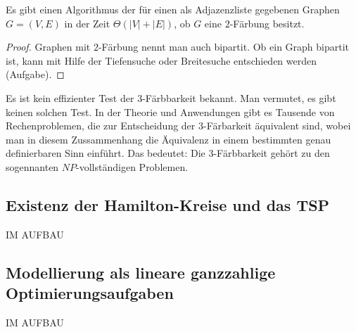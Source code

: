 \begin{prop}
		Es gibt einen Algorithmus der für einen als Adjazenzliste gegebenen Graphen $G=(V,E)$ in der Zeit $\Theta(|V|+|E|)$, ob $G$ eine $2$-Färbung besitzt. 
\end{prop} 
\begin{proof}
	Graphen mit $2$-Färbung nennt man auch bipartit. Ob ein Graph bipartit ist, kann mit Hilfe der Tiefensuche oder Breitesuche entschieden werden (Aufgabe). 
\end{proof} 

\begin{bem}
	Es ist kein effizienter Test der $3$-Färbbarkeit bekannt. Man vermutet, es gibt keinen solchen Test. 
	In der Theorie und Anwendungen gibt es Tausende von Rechenproblemen, die zur Entscheidung der $3$-Färbarkeit äquivalent sind, wobei man in diesem Zussammenhang die Äquivalenz in einem bestimmten genau definierbaren Sinn einführt. Das bedeutet: Die $3$-Färbbarkeit gehört zu den sogennanten $NP$-vollständigen Problemen. 
\end{bem} 


\condclearpage
\subsection{Existenz der Hamilton-Kreise und das TSP}

IM AUFBAU 

\subsection{Modellierung als lineare ganzzahlige Optimierungsaufgaben}

IM AUFBAU